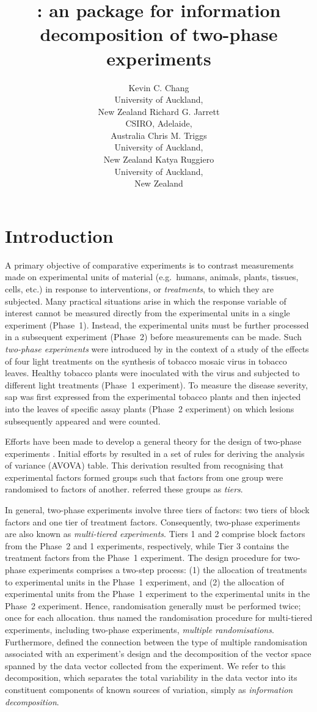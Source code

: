 \documentclass[article]{jss}
\author{Kevin C. Chang\\University of Auckland,\\ New Zealand \And
        Richard G. Jarrett\\CSIRO, Adelaide,\\ Australia \And
        Chris M. Triggs\\University of Auckland,\\ New Zealand \And
        Katya Ruggiero\\University of Auckland,\\ New Zealand }
\title{\pkg{InfoDecompuTE}: an \proglang{R} package for information decomposition of two-phase experiments }
\begin{document}
\section[Introduction]{Introduction}
A primary objective of comparative experiments is to contrast measurements made on experimental units of material (e.g.\ humans, animals, plants, tissues, cells, etc.) in response to interventions, or \emph{treatments}, to which they are subjected. Many practical situations arise in which the response variable of interest cannot be measured directly from the experimental units in a single experiment (Phase~1). Instead, the experimental units must be further processed in a subsequent experiment (Phase~2) before measurements can be made. Such \emph{two-phase experiments} were introduced by \cite{McIntyre1955} in the context of a study of the effects of four light treatments on the synthesis of tobacco mosaic virus in tobacco leaves. Healthy tobacco plants were inoculated with the virus and subjected to different light treatments (Phase~1 experiment). To measure the disease severity, sap was first expressed from the experimental tobacco plants and then injected into the leaves of specific assay plants (Phase~2 experiment) on which lesions subsequently appeared and were counted. 

Efforts have been made to develop a general theory for the design of two-phase experiments \citep{Brien1983, Wood1988, Brien1999, Jarrett2008}. Initial efforts by \cite{Brien1983} resulted in a set of rules for deriving the analysis of variance (AVOVA) table. This derivation resulted from recognising that experimental factors formed groups such that factors from one group were randomised to factors of another. \cite{Brien1983} referred these groups as \emph{tiers}. 
 
In general, two-phase experiments involve three tiers of factors: two tiers of block factors and one tier of treatment factors. Consequently, two-phase experiments are also known as \emph{multi-tiered experiments}. Tiers 1 and 2 comprise block factors from the Phase~2 and 1 experiments, respectively, while Tier 3 contains the treatment factors from the Phase~1 experiment. The design procedure for two-phase experiments comprises a two-step process: (1) the allocation of treatments to experimental units in the Phase~1 experiment, and (2) the allocation of experimental units from the Phase~1 experiment to the experimental units in the Phase~2 experiment. Hence, randomisation generally must be performed twice; once for each allocation. \cite{Brien2006b} thus named the randomisation procedure for multi-tiered experiments, including two-phase experiments, \emph{multiple randomisations}. Furthermore, \cite{Brien2009, Brien2010} defined the connection between the type of multiple randomisation associated with an experiment's design and the decomposition of the vector space spanned by the data vector collected from the experiment. We refer to this decomposition, which separates the total variability in the data vector into its constituent components of known sources of variation, simply as \emph{information decomposition}.
\end{document}
